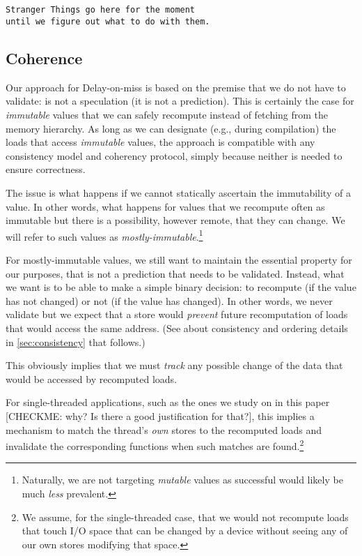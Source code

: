 \begin{verbatim}


Stranger Things go here for the moment 
until we figure out what to do with them.

 \end{verbatim}


\subsection{Coherence}
Our {\recomp} approach for Delay-on-miss is based on the premise that we do not have to validate: {\recomp} is not a speculation (it is not a prediction). This is certainly the case for \emph{immutable} values that we can safely recompute instead of fetching from the memory hierarchy. As long as we can designate (e.g., during compilation) the loads that access \emph{immutable} values, the approach is compatible with any consistency model and coherency protocol, simply because neither is needed to ensure correctness.

The issue is what happens if we cannot statically ascertain the immutability of a value. In other words, what happens for values that we recompute often as immutable but there is a possibility, however remote, that they can change. We will refer to such values as \emph{mostly-immutable}.\footnote{Naturally, we are not targeting \emph{mutable} values as successful {\recomp} would likely be much \emph{less} prevalent.}

For mostly-immutable values, we still want to maintain the essential property for our purposes, that {\recomp} is not a prediction that needs to be validated. Instead, what we want is to be able to make a simple binary decision: to recompute (if the value has not changed) or not (if the value has changed). In other words, we never validate {\recomp} but we expect that a store would \emph{prevent} future recomputation of loads that would access the same address. (See about consistency and ordering details in \autoref{sec:consistency} that follows.)

This obviously implies that we must \emph{track} any possible change of the data that would be accessed by recomputed loads.

For single-threaded applications, {\color{blue} such as the ones we study on in this paper} {\color{red} [CHECKME: why? Is there a good justification for that?]}, this implies a mechanism to match the thread's \emph{own} stores to the recomputed loads and invalidate the corresponding {\recomp} functions when such matches are found.\footnote{We assume, for the single-threaded case, that we would not recompute loads that touch I/O space that can be changed by a device without seeing any of our own stores modifying that space.}


